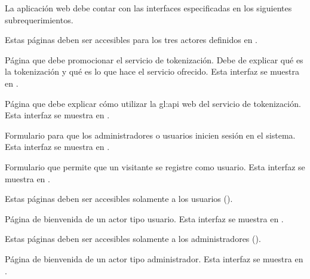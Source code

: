 {
  La aplicación web debe contar con las interfaces especificadas en los
  siguientes subrequerimientos.

  {
    Estas páginas deben ser accesibles para los tres actores definidos en
    .

    {
      Página que debe promocionar el servicio de tokenización. Debe de explicar
      qué es la tokenización y qué es lo que hace el servicio ofrecido. Esta
      interfaz se muestra en .
    }

    {
      Página que debe explicar cómo utilizar la \gls{gl:api} web del
      servicio de tokenización. Esta interfaz se muestra en
      .
    }

    {
      Formulario para que los administradores o usuarios inicien sesión en el
      sistema. Esta interfaz se muestra en .
    }

    {
       Formulario que permite que un visitante se registre como usuario.
       Esta interfaz se muestra en .
    }
  }

  {
    Estas páginas deben ser accesibles solamente a los usuarios
    ().

    {
       Página de bienvenida de un actor tipo usuario. Esta interfaz se
       muestra en .
    }
  }

  {
    Estas páginas deben ser accesibles solamente a los administradores
    ().

    {
      Página de bienvenida de un actor tipo administrador. Esta interfaz se
      muestra en .
    }
  }
}

